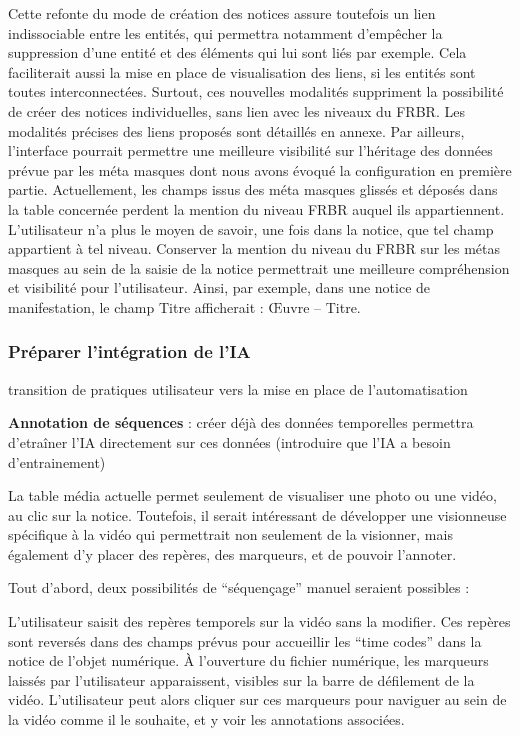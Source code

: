 Cette refonte du mode de création des notices assure toutefois un lien indissociable entre les entités, qui permettra notamment d’empêcher la suppression d’une entité et des éléments qui lui sont liés par exemple. Cela faciliterait aussi la mise en place de visualisation des liens, si les entités sont toutes interconnectées. Surtout, ces nouvelles modalités suppriment la possibilité de créer des notices individuelles, sans lien avec les niveaux du FRBR. Les modalités précises des liens proposés sont détaillés en annexe. 
Par ailleurs, l'interface pourrait permettre une meilleure visibilité sur l'héritage des données prévue par les méta masques dont nous avons évoqué la configuration en première partie. Actuellement, les champs issus des méta masques glissés et déposés dans la table concernée perdent la mention du niveau FRBR auquel ils appartiennent. L’utilisateur n’a plus le moyen de savoir, une fois dans la notice, que tel champ appartient à tel niveau. Conserver la mention du niveau du FRBR sur les métas masques au sein de la saisie de la notice permettrait une meilleure compréhension et visibilité pour l’utilisateur. Ainsi, par exemple, dans une notice de manifestation, le champ Titre
afficherait : Œuvre – Titre.

\subsubsection{Préparer l'intégration de l'IA}
transition de pratiques utilisateur vers la mise en place de l'automatisation

\textbf{Annotation de séquences} : créer déjà des données temporelles permettra d'etraîner l'IA directement sur ces données (introduire que l'IA a besoin d'entrainement)

La table média actuelle permet seulement de visualiser une photo ou une vidéo, au clic sur la notice. Toutefois, il serait intéressant de développer une visionneuse spécifique à la vidéo qui permettrait non seulement de la visionner, mais également d’y placer des repères, des marqueurs, et de pouvoir l’annoter.  

Tout d’abord, deux possibilités de “séquençage” manuel seraient possibles :  

L’utilisateur saisit des repères temporels sur la vidéo sans la modifier. Ces repères sont reversés dans des champs prévus pour accueillir les “time codes” dans la notice de l’objet numérique. À l’ouverture du fichier numérique, les marqueurs laissés par l’utilisateur apparaissent, visibles sur la barre de défilement de la vidéo. L’utilisateur peut alors cliquer sur ces marqueurs pour naviguer au sein de la vidéo comme il le souhaite, et y voir les annotations associées.  

